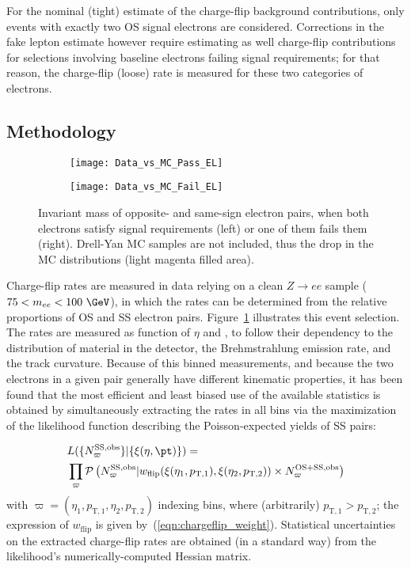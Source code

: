 For the nominal (tight) estimate of the charge-flip background contributions, only events with exactly two OS signal electrons are considered. 
Corrections in the fake lepton estimate however require estimating as well charge-flip contributions for selections involving 
baseline electrons failing signal requirements; 
for that reason, the charge-flip (loose) rate is measured for these two categories of electrons. 

\subsection*{Methodology}
\label{subsec:chargeflip_method}

\begin{figure}[t!]
\centering
\begin{subfigure}[b]{0.45\textwidth}
	\texttt{[image: Data\_vs\_MC\_Pass\_EL]}
\end{subfigure}
\begin{subfigure}[b]{0.45\textwidth}
	\texttt{[image: Data\_vs\_MC\_Fail\_EL]}
\end{subfigure}
\caption{Invariant mass of opposite- and same-sign electron pairs, 
when both electrons satisfy signal requirements (left) or one of them fails them (right). Drell-Yan MC samples are not included, thus the drop in the MC distributions (light magenta filled area).}
\label{fig:chargeflip_mee}
\end{figure}

Charge-flip rates are measured in data relying on a clean $Z\to ee$ sample ($75<m_{ee}<100~\GeV$), 
in which the rates can be determined from the relative proportions of OS and SS electron pairs. 
Figure~\ref{fig:chargeflip_mee} illustrates this event selection. 
The rates are measured as function of $\eta$ and \pt, to follow their dependency to the distribution of material in the detector, 
the Brehmstrahlung emission rate, and the track curvature. 
Because of this binned measurements, and because the two electrons in a given pair generally have different kinematic properties, 
it has been found that the most efficient and least biased use of the available statistics 
is obtained by simultaneously extracting the rates in all bins via the maximization of the likelihood function describing the 
Poisson-expected yields of SS pairs: 

\begin{equation}
\begin{aligned}
{} & L(\{N^\text{SS,obs}_\varpi\}|\{\xi(\eta,\pt)\}) 
= \\
& \prod_{\varpi} \mathcal P\left(N^\text{SS,obs}_\varpi|w_\text{flip}(\xi(\eta_1,p_{\mathrm{T},1}),\xi(\eta_2,p_{\mathrm{T},2}))\times N^\text{OS+SS,obs}_\varpi\right)
\label{eqn:chargeflip_likelihood}
\end{aligned}
\end{equation}
with $\varpi=(\eta_1,p_{\mathrm{T},1},\eta_2,p_{\mathrm{T},2})$ indexing bins, where (arbitrarily) $p_{\mathrm{T},1}>p_{\mathrm{T},2}$; 
the expression of $w_\text{flip}$ is given by~(\ref{eqn:chargeflip_weight}). 
Statistical uncertainties on the extracted charge-flip rates are obtained (in a standard way) from the likelihood's numerically-computed Hessian matrix. 


